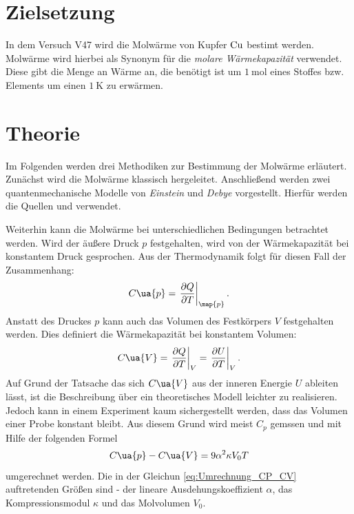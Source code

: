 \setcounter{page}{1}
\section*{Zielsetzung}
In dem Versuch V47 wird die Molwärme von Kupfer $\ce{Cu}$ bestimt werden.
Molwärme wird hierbei als Synonym für die \emph{molare Wärmekapazität} verwendet.
Diese gibt die Menge an Wärme an, die benötigt ist um $\SI{1}{\mol}$ eines Stoffes
bzw. Elements um einen $\SI{1}{\kelvin}$ zu erwärmen.

\section{Theorie}\label{sec:theorie}
Im Folgenden werden drei Methodiken zur Bestimmung der Molwärme erläutert.
Zunächst wird die Molwärme klassisch hergeleitet. Anschließend werden zwei
quantenmechanische Modelle von \emph{Einstein} und \emph{Debye}
vorgestellt. Hierfür werden die Quellen \cite{anleitungV47} und \cite[S. 215]{marx} verwendet.

Weiterhin kann die Molwärme bei unterschiedlichen Bedingungen betrachtet werden.
Wird der äußere Druck $p$ festgehalten, wird von der Wärmekapazität bei konstantem
Druck gesprochen. Aus der Thermodynamik folgt für diesen Fall der Zusammenhang:
\begin{equation}
  \label{eq:C_P}
  C\ua{p} = \left.\frac{\partial Q}{\partial T}\right|_{\map{p}}.
\end{equation}
Anstatt des Druckes $p$ kann auch das Volumen des Festkörpers $V$ festgehalten
werden. Dies definiert die Wärmekapazität bei konstantem Volumen:
\begin{equation}
  \label{eq:C_V}
  C\ua{V} = \left.\frac{\partial Q}{\partial T}\right|_{V} = \left. \frac{\partial U}{\partial T}\right|_{V}.
\end{equation}
Auf Grund der Tatsache das sich $C\ua{V}$ aus der inneren Energie $U$ ableiten
lässt, ist die Beschreibung über ein theoretisches Modell leichter zu realisieren.
Jedoch kann in einem Experiment kaum sichergestellt werden, dass das Volumen einer
Probe konstant bleibt. Aus diesem Grund wird meist $C_p$ gemssen und mit Hilfe
der folgenden Formel
\begin{equation}
  \label{eq:Umrechnung_CP_CV}
  C\ua{p} - C\ua{V} = 9\alpha^2 \kappa V_0 T
\end{equation}
umgerechnet werden. Die in der Gleichun \eqref{eq:Umrechnung_CP_CV} auftretenden
Größen sind - der lineare Ausdehungskoeffizient $\alpha$, das Kompressionsmodul
$\kappa$ und das Molvolumen $V_0$.
